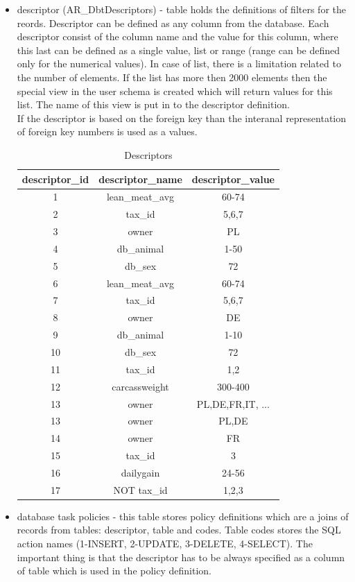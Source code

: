 \begin{itemize}
\item descriptor (AR\_DbtDescriptors) - table holds the definitions of filters for the reords. Descriptor can be defined as any column from the database. Each descriptor consist of the column name and the value for this column, where this last can be defined as a single value, list or range (range can be defined only for the numerical values). In case of list, there is a limitation related to the number of elements. If the list has more then 2000 elements then the special view in the user schema is created which will return values for this list. The name of this view is put in to the descriptor definition.\\
If the descriptor is based on the foreign key than the interanal representation of foreign key numbers is used as a values.
\begin{center}%
\begin{table}[h]
\begin{center}\begin{tabular}{|c|c|c|}
\hline descriptor\_id & descriptor\_name & descriptor\_value \\
\hline 
\hline 1  &  lean\_meat\_avg & 60-74	\\
\hline 2  &  tax\_id 	     & 5,6,7	\\
\hline 3  &  owner           & PL  	\\
\hline 4  &  db\_animal      & 1-50 	\\
\hline 5  &  db\_sex         & 72	\\
\hline 6  &  lean\_meat\_avg & 60-74 	\\
\hline 7  &  tax\_id         & 5,6,7 	\\
\hline 8  &  owner           & DE    	\\
\hline 9  &  db\_animal      & 1-10  	\\
\hline 10 &  db\_sex         & 72    	\\
\hline 11 &  tax\_id         & 1,2 	\\
\hline 12 &  carcassweight   & 300-400 	\\
\hline 13 &  owner           & PL,DE,FR,IT, ...\\
\hline 13 &  owner           & PL,DE	\\
\hline 14 &  owner           & FR 	\\
\hline 15 &  tax\_id         & 3 	\\
\hline 16 &  dailygain 	     & 24-56 	\\
\hline 17 &  NOT tax\_id     & 1,2,3 	\\
\hline
\end{tabular}\end{center}    
\caption{Descriptors}\label {descriptors}
\end{table}
\end{center}
 \newpage
\item database task policies - this table stores policy definitions which are a joins of records from tables: descriptor, table and codes. Table codes stores the SQL action names (1-INSERT, 2-UPDATE, 3-DELETE, 4-SELECT). The important thing is that the descriptor has to be always specified as a column of table which is used in the policy definition.


\end{itemize}
